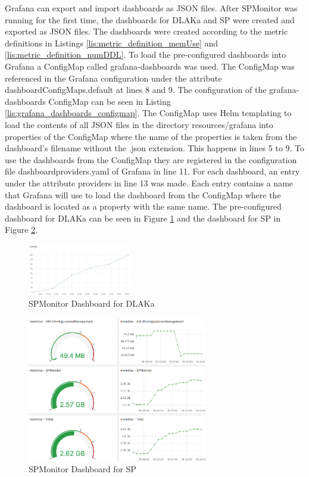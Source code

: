 Grafana can export and import dashboards as JSON files. After SPMonitor was running
for the first time, the dashboards for DLAKa and SP were created and exported as JSON files.
The dashboards were created according to the metric definitions in Listings \ref{lis:metric_definition_memUse}
and \ref{lis:metric_definition_numDDL}.
To load the pre-configured dashboards into Grafana a ConfigMap called grafana-dashboards was used.
The ConfigMap was referenced in the Grafana configuration under the attribute dashboardConfigMaps.default at lines 8 and 9.
The configuration of the grafana-dashboards ConfigMap can be seen in Listing \ref{lis:grafana_dashboards_configmap}.
The ConfigMap uses Helm templating to load the contents of all JSON files in the directory
resources/grafana into properties of the ConfigMap where the name of the properties is taken
from the dashboard's filename without the .json extension.
This happens in lines 5 to 9.
To use the dashboards from the ConfigMap they are registered in the configuration file dashboardproviders.yaml
of Grafana in line 11. For each dashboard, an entry under the attribute providers in line 13 was made.
Each entry contains a name that Grafana will use to load the dashboard from the ConfigMap
where the dashboard is located as a property with the same name.
The pre-configured dashboard for DLAKa can be seen in Figure \ref{fig:spmonitor_dlaka_dashboard}
and the dashboard for SP in Figure \ref{fig:spmonitor_sp_dashboard}.

\begin{figure}[tb]
  \centering
  \includegraphics[width=0.4\textwidth]{figures/spmonitor_dlaka_dashboard.png}
  \caption{SPMonitor Dashboard for DLAKa}
  \label{fig:spmonitor_dlaka_dashboard}
\end{figure}

\begin{figure}[tb]
  \centering
  \includegraphics[width=0.7\textwidth]{figures/spmonitor_sp_dashboard.png}
  \caption{SPMonitor Dashboard for SP}
  \label{fig:spmonitor_sp_dashboard}
\end{figure}

